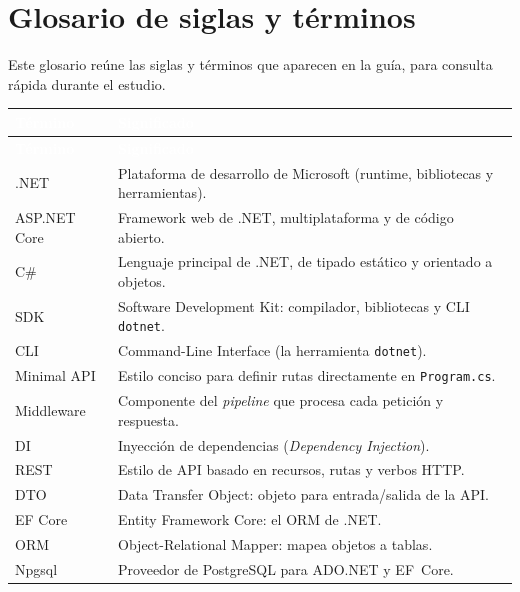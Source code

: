 \documentclass[11pt]{article}
\begin{document}
\section{Glosario de siglas y términos}
Este glosario reúne las siglas y términos que aparecen en la guía, para consulta rápida durante el estudio.

{\renewcommand{\arraystretch}{1.25}
\begin{longtable}{>{\raggedright\arraybackslash}p{3.2cm} >{\raggedright\arraybackslash}p{12.2cm}}
\rowcolor{netmorado}\textcolor{white}{\textbf{Término}} & \textcolor{white}{\textbf{Significado}} \\
\endfirsthead
\rowcolor{netmorado}\textcolor{white}{\textbf{Término}} & \textcolor{white}{\textbf{Significado}} \\
\endhead
\ttfamily\color{netmorado}.NET & Plataforma de desarrollo de Microsoft (runtime, bibliotecas y herramientas). \\ \hline
\ttfamily\color{netmorado}ASP.NET Core & Framework web de .NET, multiplataforma y de código abierto. \\ \hline
\ttfamily\color{netmorado}C\# & Lenguaje principal de .NET, de tipado estático y orientado a objetos. \\ \hline
\ttfamily\color{netmorado}SDK & Software Development Kit: compilador, bibliotecas y CLI \texttt{dotnet}. \\ \hline
\ttfamily\color{netmorado}CLI & Command-Line Interface (la herramienta \texttt{dotnet}). \\ \hline
\ttfamily\color{netmorado}Minimal API & Estilo conciso para definir rutas directamente en \texttt{Program.cs}. \\ \hline
\ttfamily\color{netmorado}Middleware & Componente del \emph{pipeline} que procesa cada petición y respuesta. \\ \hline
\ttfamily\color{netmorado}DI & Inyección de dependencias (\emph{Dependency Injection}). \\ \hline
\ttfamily\color{netmorado}REST & Estilo de API basado en recursos, rutas y verbos HTTP. \\ \hline
\ttfamily\color{netmorado}DTO & Data Transfer Object: objeto para entrada/salida de la API. \\ \hline
\ttfamily\color{netmorado}EF Core & Entity Framework Core: el ORM de .NET. \\ \hline
\ttfamily\color{netmorado}ORM & Object-Relational Mapper: mapea objetos a tablas. \\ \hline
\ttfamily\color{netmorado}Npgsql & Proveedor de PostgreSQL para ADO.NET y EF~Core. \\ \hline

\end{longtable}}
\end{document}
